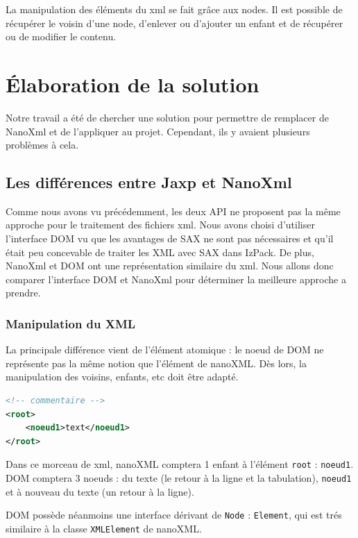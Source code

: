 La manipulation des éléments du xml se fait grâce aux nodes.
Il est possible de récupérer le voisin d'une node, d'enlever ou d'ajouter un enfant et de récupérer ou de modifier le contenu.
\section{Élaboration de la solution}
Notre travail a été de chercher une solution pour permettre de remplacer de NanoXml et de l'appliquer au projet.
Cependant, ils y avaient plusieurs problèmes à cela.
\subsection{Les différences entre Jaxp et NanoXml}
Comme nous avons vu précédemment, les deux API ne proposent pas la même approche pour le traitement des fichiers xml.
Nous avons choisi d'utiliser l'interface DOM vu que les avantages de SAX ne sont pas nécessaires et qu'il était peu concevable de traiter les XML avec SAX dans IzPack.
De plus, NanoXml et DOM ont une représentation similaire du xml.
Nous allons donc comparer l'interface DOM et NanoXml pour déterminer la meilleure approche a prendre.
\subsubsection{Manipulation du XML}
La principale différence vient de l'élément atomique : le noeud de DOM ne représente pas la même notion que l'élément de nanoXML.
Dès lors, la manipulation des voisins, enfants, etc doit être adapté.
\begin{lstlisting}[language=xml]
<!-- commentaire -->
<root>
	<noeud1>text</noeud1>
</root>
\end{lstlisting}
Dans ce morceau de xml, nanoXML comptera 1 enfant à l'élément \verb|root| : \verb|noeud1|.
DOM comptera 3 noeuds : du texte (le retour à la ligne et la tabulation), \verb|noeud1| et à nouveau du texte (un retour à la ligne).

DOM possède néanmoins une interface dérivant de \verb|Node| : \verb|Element|, qui est trés similaire à la classe \verb|XMLElement| de nanoXML.
